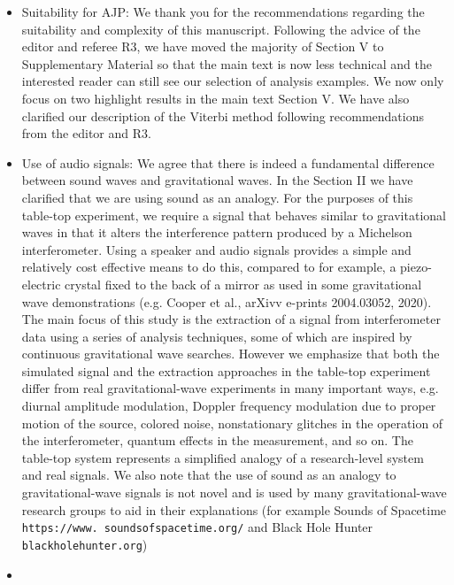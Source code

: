 \documentclass{article}
\newcommand{\han}{\textcolor{orange}}
\begin{document}
\begin{itemize}
\item Suitability for AJP: We thank you for the recommendations regarding the suitability and complexity of this manuscript. Following the advice of the editor and referee R3, we have moved the majority of Section V to Supplementary Material so that the main text is now less technical and the interested reader can still see our selection of analysis examples. We now only focus on two highlight results in the main text Section V. We have also clarified our description of the Viterbi method following recommendations from the editor and R3. 
\item Use of audio signals: We agree that there is indeed a fundamental difference between sound waves and gravitational waves. In the Section II we have clarified that we are using sound as an analogy. For the purposes of this table-top experiment, we require a signal that behaves similar to gravitational waves in that it alters the interference pattern produced by a Michelson interferometer. Using a speaker and audio signals provides a simple and relatively cost effective means to do this, compared to for example, a piezo-electric crystal fixed to the back of a mirror as used in some gravitational wave demonstrations (e.g. Cooper et al., arXivv e-prints 2004.03052, 2020). The main focus of this study is the extraction of a signal from interferometer data using a series of analysis techniques, some of which are inspired by continuous gravitational wave searches. However we emphasize that both the simulated signal and the extraction approaches in the table-top experiment differ from real gravitational-wave experiments in many important ways, e.g. diurnal amplitude modulation, Doppler frequency modulation due to proper motion of the source, colored noise, nonstationary glitches in the operation of the interferometer, quantum effects in the measurement, and so on. The table-top system represents a simplified analogy of a research-level system and real signals.  We also note that the use of sound as an analogy to gravitational-wave signals is not novel and is used by many gravitational-wave research groups to aid in their explanations (for example Sounds of Spacetime \texttt{https://www.
soundsofspacetime.org/} and Black Hole Hunter \texttt{blackholehunter.org})
\item[]

\end{itemize}
\end{document}

